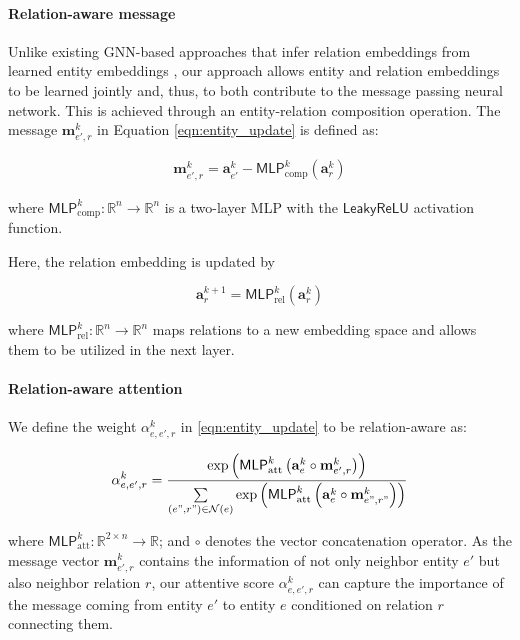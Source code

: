 \documentclass[11pt]{article}
\begin{document}
\paragraph{Relation-aware message} Unlike existing GNN-based approaches that  infer relation embeddings from learned entity embeddings \cite{sun2020knowledge}, our approach allows entity and relation embeddings to be learned jointly and, thus, to both contribute to the message passing neural network. This is achieved through an entity-relation composition operation. The message $\mathbf{m}^k_{e',r}$ in Equation \ref{eqn:entity_update} is defined  as:



\begin{align}
\label{eqn:ramessage}
    \mathbf{m}^k_{e',r} = \mathbf{a}^k_{e'} - \mathsf{MLP}^k_{\text{comp}}\left(\mathbf{a}^k_r \right) 
\end{align}

\noindent where $\mathsf{MLP}^k_{\text{comp}}: \mathbb{R}^n \rightarrow \mathbb{R}^n$ is a two-layer MLP with the $\mathsf{LeakyReLU}$ activation function.  

Here, the relation embedding is updated by

\begin{equation}
    \mathbf{a}_r^{k + 1} = \mathsf{MLP}^k_{\text{rel}} \left( \mathbf{a}_r^k \right)
    \label{eqn:relation_update}
\end{equation}

\noindent where $\mathsf{MLP}^k_{\text{rel}}: \mathbb{R} ^ n \rightarrow \mathbb{R} ^ n$ maps relations to a new embedding space and allows them to be utilized in the next layer. 


\paragraph{Relation-aware attention} We define the weight $\alpha^k_{e,e',r}$ in \autoref{eqn:entity_update} to be relation-aware as:

{\small
\begin{equation}
\label{eqn:ra_attention}
    \alpha_{e, e', r}^k = \frac{\exp\left(\mathsf{MLP}_{\text{att}}^k\left(\mathbf{a}_e^k \circ \mathbf{m}^k_{e', r}\right)\right)
    }{\sum\limits_{(e", r") \in \mathcal{N}(e)} \exp\left(\mathsf{MLP}_{\text{att}}^k\left(\mathbf{a}_e^k \circ \mathbf{m}^k_{e", r"}\right)\right)} 
\end{equation}
}



\noindent where $\mathsf{MLP}_{\text{att}}^k: \mathbb{R}^{2\times n} \rightarrow \mathbb{R}$;  and $\circ$ denotes the vector concatenation operator. As the message vector $\mathbf{m}_{e',r}^k$ contains the information of not only neighbor entity $e'$ but also neighbor relation $r$, our attentive score $\alpha_{e,e',r}^k$ can capture the importance of the message coming from entity $e'$ to entity $e$ conditioned on relation $r$ connecting them. 
\end{document}
